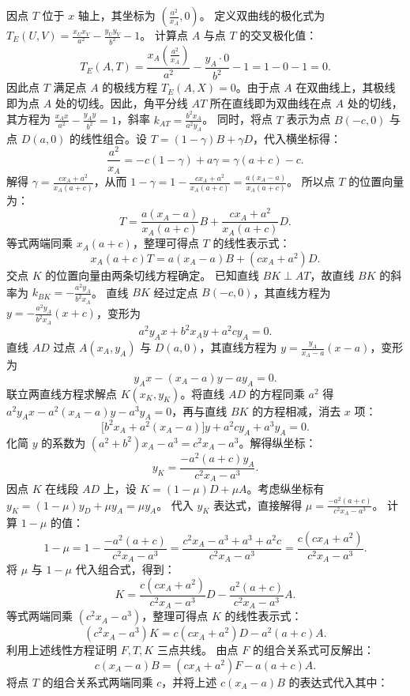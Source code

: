\begin{solution}
因点 $T$ 位于 $x$ 轴上，其坐标为 $\left(\frac{a^2}{x_A}, 0\right)$。
定义双曲线的极化式为 $T_E(U, V) = \frac{x_U x_V}{a^2} - \frac{y_U y_V}{b^2} - 1$。
计算点 $A$ 与点 $T$ 的交叉极化值：
\[ T_E(A, T) = \frac{x_A \left(\frac{a^2}{x_A}\right)}{a^2} - \frac{y_A \cdot 0}{b^2} - 1 = 1 - 0 - 1 = 0. \]
因此点 $T$ 满足点 $A$ 的极线方程 $T_E(A, X) = 0$。由于点 $A$ 在双曲线上，其极线即为点 $A$ 处的切线。因此，角平分线 $AT$ 所在直线即为双曲线在点 $A$ 处的切线，其方程为 $\frac{x_A x}{a^2} - \frac{y_A y}{b^2} = 1$，斜率 $k_{AT} = \frac{b^2 x_A}{a^2 y_A}$。
同时，将点 $T$ 表示为点 $B(-c, 0)$ 与点 $D(a, 0)$ 的线性组合。设 $T = (1-\gamma)B + \gamma D$，代入横坐标得：
\[ \frac{a^2}{x_A} = -c(1-\gamma) + a\gamma = \gamma(a+c) - c. \]
解得 $\gamma = \frac{cx_A + a^2}{x_A(a+c)}$，从而 $1-\gamma = 1 - \frac{cx_A + a^2}{x_A(a+c)} = \frac{a(x_A - a)}{x_A(a+c)}$。
所以点 $T$ 的位置向量为：
\[ T = \frac{a(x_A - a)}{x_A(a+c)} B + \frac{cx_A + a^2}{x_A(a+c)} D. \]
等式两端同乘 $x_A(a+c)$，整理可得点 $T$ 的线性表示式：
\[ x_A(a + c) T = a(x_A - a) B + (cx_A + a^2) D. \]
交点 $K$ 的位置向量由两条切线方程确定。
已知直线 $BK \perp AT$，故直线 $BK$ 的斜率为 $k_{BK} = -\frac{a^2 y_A}{b^2 x_A}$。
直线 $BK$ 经过定点 $B(-c, 0)$，其直线方程为 $y = -\frac{a^2 y_A}{b^2 x_A}(x + c)$，变形为
\[ a^2 y_A x + b^2 x_A y + a^2 c y_A = 0. \]
直线 $AD$ 过点 $A(x_A, y_A)$ 与 $D(a, 0)$，其直线方程为 $y = \frac{y_A}{x_A - a}(x - a)$，变形为
\[ y_A x - (x_A - a)y - a y_A = 0. \]
联立两直线方程求解点 $K(x_K, y_K)$。将直线 $AD$ 的方程同乘 $a^2$ 得 $a^2 y_A x - a^2(x_A - a)y - a^3 y_A = 0$，再与直线 $BK$ 的方程相减，消去 $x$ 项：
\[ \big[b^2 x_A + a^2(x_A - a)\big]y + a^2 c y_A + a^3 y_A = 0. \]
化简 $y$ 的系数为 $(a^2 + b^2)x_A - a^3 = c^2 x_A - a^3$。解得纵坐标：
\[ y_K = \frac{-a^2(a+c)y_A}{c^2 x_A - a^3}. \]
因点 $K$ 在线段 $AD$ 上，设 $K = (1-\mu)D + \mu A$。考虑纵坐标有 $y_K = (1-\mu)y_D + \mu y_A = \mu y_A$。
代入 $y_K$ 表达式，直接解得 $\mu = \frac{-a^2(a+c)}{c^2 x_A - a^3}$。
计算 $1-\mu$ 的值：
\[ 1 - \mu = 1 - \frac{-a^2(a+c)}{c^2 x_A - a^3} = \frac{c^2 x_A - a^3 + a^3 + a^2 c}{c^2 x_A - a^3} = \frac{c(cx_A + a^2)}{c^2 x_A - a^3}. \]
将 $\mu$ 与 $1-\mu$ 代入组合式，得到：
\[ K = \frac{c(cx_A + a^2)}{c^2 x_A - a^3} D - \frac{a^2(a+c)}{c^2 x_A - a^3} A. \]
等式两端同乘 $(c^2 x_A - a^3)$，整理可得点 $K$ 的线性表示式：
\[ (c^2 x_A - a^3) K = c(cx_A + a^2) D - a^2(a+c) A. \]
利用上述线性方程证明 $F, T, K$ 三点共线。
由点 $F$ 的组合关系式可反解出：
\[ c(x_A - a) B = (cx_A + a^2) F - a(a + c) A. \]
将点 $T$ 的组合关系式两端同乘 $c$，并将上述 $c(x_A - a) B$ 的表达式代入其中：
\begin{align*}

\end{align*}
\end{solution}
